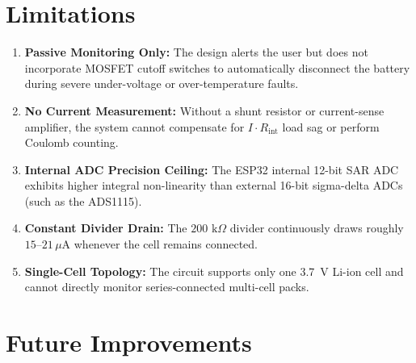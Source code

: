 \documentclass[12pt,a4paper]{article}
\begin{document}
\section{Limitations}
\label{sec:limitations}

\begin{enumerate}
    \item \textbf{Passive Monitoring Only:} The design alerts the user but does not incorporate MOSFET cutoff switches to automatically disconnect the battery during severe under-voltage or over-temperature faults.
    \item \textbf{No Current Measurement:} Without a shunt resistor or current-sense amplifier, the system cannot compensate for $I \cdot R_{\text{int}}$ load sag or perform Coulomb counting.
    \item \textbf{Internal ADC Precision Ceiling:} The ESP32 internal 12-bit SAR ADC exhibits higher integral non-linearity than external 16-bit sigma-delta ADCs (such as the ADS1115).
    \item \textbf{Constant Divider Drain:} The $200\text{ k}\Omega$ divider continuously draws roughly $15$--$21\,\mu\text{A}$ whenever the cell remains connected.
    \item \textbf{Single-Cell Topology:} The circuit supports only one 3.7~V Li-ion cell and cannot directly monitor series-connected multi-cell packs.
\end{enumerate}

\section{Future Improvements}
\label{sec:future_improvements}
\end{document}
